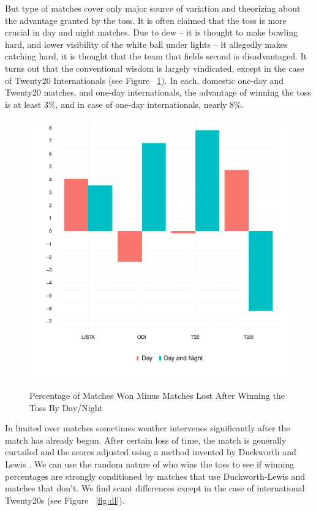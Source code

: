 \documentclass[11pt]{article}
\begin{document}
But type of matches cover only major source of variation and theorizing about the advantage granted by the toss. It is often claimed that the toss is more crucial in day and night matches. Due to dew -- it is thought to make bowling hard, and lower visibility of the white ball under lights -- it allegedly makes catching hard, it is thought that the team that fields second is disadvantaged. It turns out that the conventional wisdom is largely vindicated, except in the case of Twenty20 Internationals (see Figure ~\ref{fig:dn}). In each, domestic one-day and Twenty20 matches, and one-day internationals, the advantage of winning the toss is at least 3\%, and in case of one-day internationals, nearly 8\%.

\begin{figure}[htbp]
\centering
\caption{Percentage of Matches Won Minus Matches Lost After Winning the Toss By Day/Night}
\includegraphics[scale=.85]{../figs/winbyDayNight.pdf}
\label{fig:dn}
\end{figure}

In limited over matches sometimes weather intervenes significantly after the match has already begun. After certain loss of time, the match is generally curtailed and the scores adjusted using a method invented by Duckworth and Lewis \citep[see][]{duckworth1998}. We can use the random nature of who wins the toss to see if winning percentages are strongly conditioned by matches that use Duckworth-Lewis and matches that don't. We find scant differences except in the case of international Twenty20s (see Figure ~\ref{fig:dl}).
\end{document}
